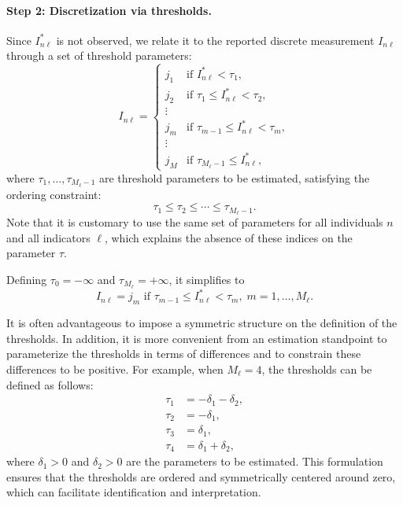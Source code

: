 \documentclass[12pt,a4paper]{article}
\begin{document}
\paragraph{Step 2: Discretization via thresholds.} Since $I^*_{n\ell}$ is not observed, we relate it to the reported discrete measurement $I_{n\ell}$ through a set of threshold parameters:
\begin{equation}
\label{eq:discreteMeas-b}
I_{n\ell} = \left\{
\begin{array}{ll}
j_1 & \text{if } I^*_{n\ell} < \tau_1, \\
j_2 & \text{if } \tau_1 \leq I^*_{n\ell} < \tau_2, \\
\vdots \\
j_m & \text{if } \tau_{m-1} \leq I^*_{n\ell} < \tau_m, \\
\vdots \\
j_M & \text{if } \tau_{M_\ell-1} \leq I^*_{n\ell},
\end{array}
\right.
\end{equation}
where $\tau_1, \ldots, \tau_{M_\ell-1}$ are threshold parameters to be estimated, satisfying the ordering constraint:
\begin{equation}
\label{eq:discreteMeas-c}
\tau_1 \leq \tau_2 \leq \cdots \leq \tau_{M_\ell-1}.
\end{equation}
Note that it is customary to use the same set of parameters for all
individuals $n$ and all indicators $\ell$, which explains the absence
of these indices on the parameter $\tau$.

Defining $\tau_0=-\infty$ and $\tau_{M_\ell}=+\infty$, it simplifies to
\begin{equation}
  \label{eq:prob_indicator}
I_{n\ell} = j_m  \text{ if } \tau_{m-1} \leq I^*_{n\ell} < \tau_m, \; m=1, \ldots, M_\ell. 
\end{equation}

It is often advantageous to impose a symmetric structure on the
definition of the thresholds. In addition, it is more convenient from
an estimation standpoint to parameterize the thresholds in terms of
differences and to constrain these differences to be positive. For
example, when \( M_\ell = 4 \), the thresholds can be defined as
follows:
\[
\begin{aligned}
  \tau_1 &= -\delta_1 - \delta_2, \\
  \tau_2 &= -\delta_1, \\
  \tau_3 &= \delta_1, \\
  \tau_4 &= \delta_1 + \delta_2,
\end{aligned}
\]
where \( \delta_1 > 0 \) and \( \delta_2 > 0 \) are the parameters to
be estimated. This formulation ensures that the thresholds are ordered
and symmetrically centered around zero, which can facilitate
identification and interpretation.
\end{document}

